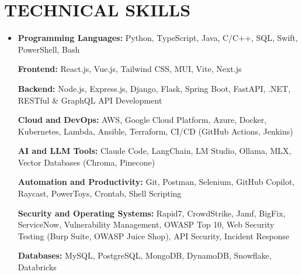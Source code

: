 \documentclass[letterpaper,10pt]{article}
\newcommand{\resumeSubHeadingListStart}{\begin{itemize}[leftmargin=0in,label={}]}
\newcommand{\resumeSubHeadingListEnd}{\end{itemize}}
\begin{document}
\section{TECHNICAL SKILLS}
\vspace{6pt}
\resumeSubHeadingListStart
\item \small{

\textbf{Programming Languages:} Python, TypeScript, Java, C/C++, SQL, Swift, PowerShell, Bash

\vspace{3pt}

\textbf{Frontend:} React.js, Vue.js, Tailwind CSS, MUI, Vite, Next.js

\vspace{3pt}

\textbf{Backend:} Node.js, Express.js, Django, Flask, Spring Boot, FastAPI, .NET, RESTful \& GraphQL API Development

\vspace{3pt}

\textbf{Cloud and DevOps:} AWS, Google Cloud Platform, Azure, Docker, Kubernetes, Lambda, Ansible, Terraform, CI/CD (GitHub Actions, Jenkins)

\vspace{3pt}

\textbf{AI and LLM Tools:} Claude Code, LangChain, LM Studio, Ollama, MLX, Vector Databases (Chroma, Pinecone)

\vspace{3pt}

\textbf{Automation and Productivity:} Git, Postman, Selenium, GitHub Copilot, Raycast, PowerToys, Crontab, Shell Scripting

\vspace{3pt}

\textbf{Security and Operating Systems:} Rapid7, CrowdStrike, Jamf, BigFix, ServiceNow, Vulnerability Management, OWASP Top 10, Web Security Testing (Burp Suite, OWASP Juice Shop), API Security, Incident Response

\vspace{3pt}

\textbf{Databases:} MySQL, PostgreSQL, MongoDB, DynamoDB, Snowflake, Databricks

}
\resumeSubHeadingListEnd
\end{document}
